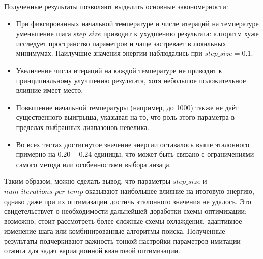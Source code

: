 \documentclass[a4paper]{report}
\begin{document}
Полученные результаты позволяют выделить основные закономерности:
\begin{itemize}
    \item При фиксированных начальной температуре и числе итераций на температуре уменьшение шага $step\_size$ приводит к ухудшению результата: алгоритм хуже исследует пространство параметров и чаще застревает в локальных минимумах. Наилучшие значения энергии наблюдались при $step\_size = 0.1$.
    \item Увеличение числа итераций на каждой температуре не приводит к принципиальному улучшению результата, хотя небольшое положительное влияние имеет место.
    \item Повышение начальной температуры (например, до 1000) также не даёт существенного выигрыша, указывая на то, что роль этого параметра в пределах выбранных диапазонов невелика.
    \item Во всех тестах достигнутое значение энергии оставалось выше эталонного примерно на $0.20-0.24$ единицы, что может быть связано с ограничениями самого метода или особенностями выбора анзаца.
\end{itemize}

Таким образом, можно сделать вывод, что параметры $step\_size$ и $num\_iterations\_per\_temp$ оказывают наибольшее влияние на итоговую энергию, однако даже при их оптимизации достичь эталонного значения не удалось. Это свидетельствует о необходимости дальнейшей доработки схемы оптимизации: возможно, стоит рассмотреть более сложные схемы охлаждения, адаптивное изменение шага или комбинированные алгоритмы поиска. Полученные результаты подчеркивают важность тонкой настройки параметров имитации отжига для задач вариационной квантовой оптимизации.




\end{document}
